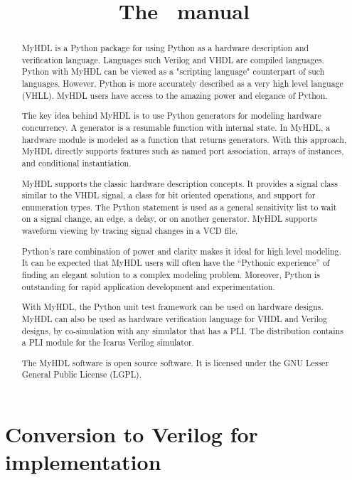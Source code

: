 \documentclass{manual}
\title{The \myhdl\ manual}
\newcommand{\myhdl}{\protect \mbox{MyHDL}}
\begin{document}
\maketitle



\begin{abstract}

\noindent

\myhdl{} is a Python package for using Python as a hardware description
and verification language. Languages such Verilog and VHDL are
compiled languages. Python with \myhdl{} can be viewed as a "scripting
language" counterpart of such languages. However, Python is more
accurately described as a very high level language (VHLL). \myhdl{} users
have access to the amazing power and elegance of Python.

The key idea behind \myhdl{} is to use Python generators for modeling
hardware concurrency. A generator is a resumable function with
internal state. In \myhdl{}, a hardware module is modeled as a function
that returns generators. With this approach, \myhdl{} directly supports
features such as named port association, arrays of instances, and
conditional instantiation. 

\myhdl{} supports the classic hardware description concepts.  It provides
a signal class similar to the VHDL signal, a class for bit oriented
operations, and support for enumeration types.  The Python
 statement is used as a general sensitivity list to
wait on a signal change, an edge, a delay, or on another
generator. \myhdl{} supports waveform viewing by tracing signal changes
in a VCD file.

Python's rare combination of power and clarity makes it ideal for high
level modeling.  It can be expected that \myhdl{} users will often
have the ``Pythonic experience'' of finding an elegant solution to a
complex modeling problem. Moreover, Python is outstanding for rapid
application development and experimentation.

With \myhdl{}, the Python unit test framework can be used on hardware
designs.  \myhdl{} can also be used as hardware verification language for
VHDL and Verilog designs, by co-simulation with any simulator that has
a PLI.  The distribution contains a PLI module for the
Icarus Verilog simulator.

The \myhdl{} software is open source software. It is licensed under the
GNU Lesser General Public License (LGPL).




\end{abstract}

\tableofcontents







\chapter{Conversion to Verilog for implementation \label{conversion}}





\end{document}
